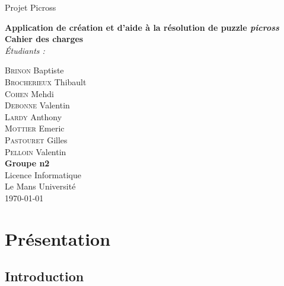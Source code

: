 \documentclass{report}
\begin{document}
\begin{titlepage}
	\begin{center}
	
		\begin{spacing}{1.5}
			Projet Picross\\
			\vspace*{\fill}
		\end{spacing}
		
		\begin{spacing}{2.5}
			\textbf{\Huge Application de création et d'aide à la résolution de puzzle \textit{picross}}\\[0.5cm]
			\textbf{\huge Cahier des charges} \\
			\vspace*{\fill}
			\textit{Étudiants :}
		\end{spacing}

		\begin{spacing}{1.15}
			\large
			\textsc{Brinon} Baptiste\\
			\textsc{Brocherieux} Thibault\\
			\textsc{Cohen} Mehdi\\
			\textsc{Debonne} Valentin\\
			\textsc{Lardy} Anthony\\
			\textsc{Mottier} Emeric\\
			\textsc{Pastouret} Gilles\\
			\textsc{Pelloin} Valentin\\
			\vspace*{\fill}
			\textbf{Groupe n2} \\
			\textnormal{\large Licence Informatique\\ Le Mans Université\\ \today}
		\end{spacing}
		
	\end{center}
\end{titlepage}


\renewcommand{\contentsname}{Sommaire}
\tableofcontents


\chapter{Présentation}

	\section{Introduction}
\end{document}
